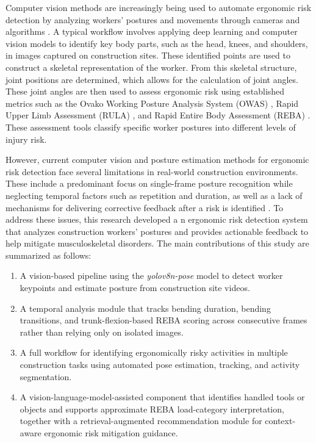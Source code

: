 \documentclass[11pt]{article}
\begin{document}
Computer vision methods are increasingly being used to automate ergonomic risk detection by analyzing workers' postures and movements through cameras and algorithms \citep{seo2021automated}. A typical workflow involves applying deep learning and computer vision models to identify key body parts, such as the head, knees, and shoulders, in images captured on construction sites. These identified points are used to construct a skeletal representation of the worker. From this skeletal structure, joint positions are determined, which allows for the calculation of joint angles. These joint angles are then used to assess ergonomic risk using established metrics such as the Ovako Working Posture Analysis System (OWAS) \citep{karhu1977correcting}, Rapid Upper Limb Assessment (RULA) \citep{mcatamney1993rula}, and Rapid Entire Body Assessment (REBA) \citep{hignett2000rapid}. These assessment tools classify specific worker postures into different levels of injury risk.

However, current computer vision and posture estimation methods for ergonomic risk detection face several limitations in real-world construction environments. These include   a predominant focus on single-frame posture recognition while neglecting temporal  factors such as repetition and   duration, as well as a lack of mechanisms for delivering corrective feedback after a risk is identified . To address these issues, this research developed a n  ergonomic risk detection system   that analyzes construction workers' postures and provides  actionable feedback to help mitigate musculoskeletal disorders. The   main  contributions of this study are   summarized as follows:

\begin{enumerate}[nosep, leftmargin=*]
    \item A vision-based pipeline using the \textit{yolov8n-pose} model to detect worker keypoints and estimate posture from construction site videos.
    \item A temporal analysis module that tracks bending duration, bending transitions, and trunk-flexion-based REBA scoring across consecutive frames rather than relying only on isolated images.
    \item A full workflow for identifying ergonomically risky activities in multiple construction tasks using automated pose estimation, tracking, and activity segmentation.
    \item A vision-language-model-assisted component that identifies handled tools or objects and supports approximate REBA load-category interpretation, together with a  retrieval-augmented   recommendation module for context-aware ergonomic risk mitigation guidance.
\end{enumerate}
 
\end{document}
